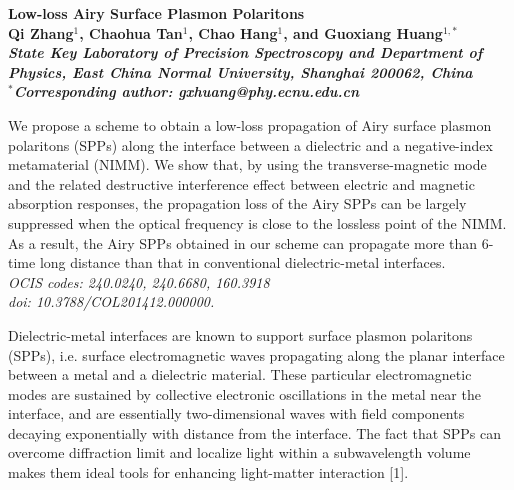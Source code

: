 \documentclass[aps,pra,preprint,groupedaddress,amsmath,amssymb,showpacs]{revtex4-1}
\begin{document}
\renewcommand{\baselinestretch}{0.9}
\begin{center}
\LARGE \bf Low-loss Airy Surface Plasmon Polaritons
\\ %
\parskip=0.5cm
\renewcommand{\baselinestretch}{1.2}
\normalsize Qi Zhang$^{1}$, Chaohua Tan$^{1}$, Chao Hang$^{1}$, and Guoxiang Huang$^{1,*}$\\
\parskip=0.65cm
\small \sl{ State Key Laboratory of Precision Spectroscopy and Department of Physics,
East China Normal University, Shanghai 200062, China}\\
$^*$Corresponding author: gxhuang@phy.ecnu.edu.cn\\
\end{center}

\parskip=-0.6cm
\renewcommand{\baselinestretch}{0.92}

\begin{minipage}[t]{15cm}\normalsize \noindent \small
We propose a scheme to obtain a low-loss propagation of Airy surface plasmon polaritons (SPPs) along the interface between a dielectric and a negative-index metamaterial (NIMM). We show that, by using the transverse-magnetic mode and the related destructive interference effect between electric and magnetic absorption responses, the propagation loss of the Airy SPPs can be largely suppressed when the optical frequency is close to the lossless point of the NIMM. As a result, the Airy SPPs obtained in our scheme can propagate more than 6-time long distance than that in conventional dielectric-metal interfaces.
\\
\mbox{} \hspace{0.3cm}\sl OCIS codes: \rm 240.0240, 240.6680, 160.3918\\
\mbox{} \hspace{0.3cm}\sl doi: 10.3788/COL201412.000000.
\end{minipage}

\normalsize\parindent=0.3cm \noindent
\newpage

Dielectric-metal interfaces are known to support surface plasmon polaritons (SPPs), i.e. surface electromagnetic waves propagating along the planar interface between a metal and a dielectric material. These particular electromagnetic modes are sustained by collective electronic oscillations in the metal near the interface, and are essentially two-dimensional waves with field components decaying exponentially with distance from the interface. The fact that SPPs can overcome diffraction limit and localize light within a subwavelength volume makes them ideal tools for enhancing light-matter interaction [1].
\end{document}
